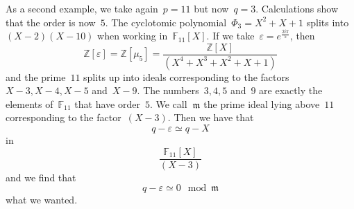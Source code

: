 \begin{example}
  As a second example, we take again~${p = 11}$ but now~${q = 3}$. Calculations show that the order is now~$5$. The cyclotomic polynomial~${\Phi_3 = X^2 + X + 1}$ splits into~${(X - 2)(X - 10)}$ when working in~${\mathbb{F}_{11}[X]}$. If we take~${\varepsilon = e^{\frac{2i\pi}{5}}}$, then
  \begin{equation}
    \mathbb{Z}[\varepsilon] = \mathbb{Z}[\mu_5] = \frac{\mathbb{Z}[X]}{(X^4 + X^3 + X^2 + X + 1)} 
  \end{equation}
  and the prime~$11$ splits up into ideals corresponding to the factors~${X - 3, X - 4, X - 5}$ and~${X - 9}$. The numbers~${3,4,5}$ and~${9}$ are exactly the elements of~${\mathbb{F}_{11}}$ that have order~$5$. We call~${\frak{m}}$ the prime ideal lying above~$11$ corresponding to the factor~${(X - 3)}$. Then we have that
  \begin{equation}
    q - \varepsilon \simeq q - X 
  \end{equation}
  in
  \begin{equation}
    \frac{\mathbb{F}_{11}[X]}{(X-3)}  
  \end{equation}
  and we find that
  \begin{equation}
    q - \varepsilon \simeq 0 \mod \mathfrak{m}  
  \end{equation}
  what we wanted.
\end{example}
